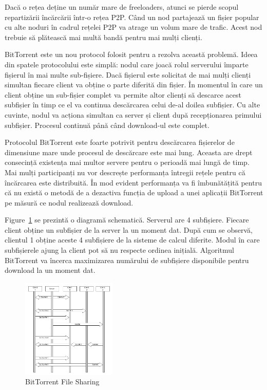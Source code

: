 Dacă o rețea deține un număr mare de freeloaders, atunci se pierde scopul
repartizării încărcării într-o rețea P2P. Când un nod partajează un fișier
popular cu alte noduri în cadrul rețelei P2P va atrage un volum mare de
trafic. Acest nod trebuie să plătească mai multă bandă pentru mai mulți
clienți.

BitTorrent este un nou protocol folosit pentru a rezolva această problemă.
Ideea din spatele protocolului este simplă: nodul care joacă rolul serverului
împarte fișierul în mai multe sub-fișiere. Dacă fișierul este solicitat de mai
mulți clienți simultan fiecare client va obține o parte diferită din fișier.
În momentul în care un client obține un sub-fișier complet va permite altor
clienți să descarce acest subfișier în timp ce el va continua descărcarea
celui de-al doilea subfișier. Cu alte cuvinte, nodul va acționa simultan ca
server și client după recepționarea primului subfișier. Procesul continuă până
când download-ul este complet.

Protocolul BitTorrent este foarte potrivit pentru descărcarea fișierelor de
dimensiune mare unde procesul de descărcare este mai lung. Aceasta are drept
consecință existența mai multor servere pentru o perioadă mai lungă de timp.
Mai mulți participanți nu vor descrește performanța întregii rețele pentru că
încărcarea este distribuită. În mod evident performanța va fi îmbunătățită
pentru că nu există o metodă de a dezactiva funcția de upload a unei aplicații
BitTorrent pe măsură ce nodul realizează download.

Figure~\ref{fig:p2p-systems:bittorrent} se prezintă o diagramă schematică.
Serverul are 4 subfișiere. Fiecare client obține un subfișier de la server la
un moment dat.  După cum se observă, clientul 1 obține aceste 4 subfișiere de
la sisteme de calcul diferite. Modul în care subfișierele ajung la client pot
să nu respecte ordinea inițială. Algoritmul BitTorrent va încerca maximizarea
numărului de subfișiere disponibile pentru download la un moment dat.

\begin{figure}
  \centering
  \includegraphics[width=0.4\textwidth]{src/img/p2p-systems/bittorrent}
  \caption{BitTorrent File Sharing}
  \label{fig:p2p-systems:bittorrent}
\end{figure}

